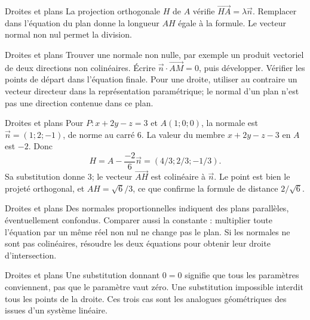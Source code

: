 \documentclass[aspectratio=169,10pt]{beamer}
\begin{document}
\begin{frame}{Droites et plans}
La projection orthogonale \(H\) de \(A\) vérifie \(\overrightarrow{HA}=\lambda\overrightarrow{n}\). Remplacer dans l’équation du plan donne la longueur \(AH\) égale à la formule. Le vecteur normal non nul permet la division.
\end{frame}
\begin{frame}{Droites et plans}
Trouver une normale non nulle, par exemple un produit vectoriel de deux directions non colinéaires. Écrire \(\overrightarrow{n}\cdot\overrightarrow{AM}=0\), puis développer. Vérifier les points de départ dans l’équation finale. Pour une droite, utiliser au contraire un vecteur directeur dans la représentation paramétrique; le normal d’un plan n’est pas une direction contenue dans ce plan.
\end{frame}
\begin{frame}{Droites et plans}
Pour \(P:x+2y-z=3\) et \(A(1;0;0)\), la normale est \(\overrightarrow{n}=(1;2;-1)\), de norme au carré \(6\). La valeur du membre \(x+2y-z-3\) en \(A\) est \(-2\). Donc
\[
H=A-\dfrac{-2}{6}\overrightarrow{n}=(4/3;2/3;-1/3).
\]
Sa substitution donne \(3\); le vecteur \(\overrightarrow{AH}\) est colinéaire à \(\overrightarrow{n}\). Le point est bien le projeté orthogonal, et \(AH=\sqrt6/3\), ce que confirme la formule de distance \(2/\sqrt6\).
\end{frame}
\begin{frame}{Droites et plans}
Des normales proportionnelles indiquent des plans parallèles, éventuellement confondus. Comparer aussi la constante : multiplier toute l’équation par un même réel non nul ne change pas le plan. Si les normales ne sont pas colinéaires, résoudre les deux équations pour obtenir leur droite d’intersection.
\end{frame}
\begin{frame}{Droites et plans}
Une substitution donnant \(0=0\) signifie que tous les paramètres conviennent, pas que le paramètre vaut zéro. Une substitution impossible interdit tous les points de la droite. Ces trois cas sont les analogues géométriques des issues d’un système linéaire.
\end{frame}
\end{document}
